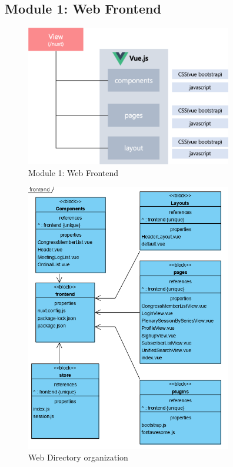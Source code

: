 \documentclass[conference]{IEEEtran}
\begin{document}
\vspace{70mm}
\subsection{Module 1: Web Frontend}
\begin{figure}[htbp]
	\centerline{\includegraphics[width=90mm,scale=0.5]{fig/6_4.png}}
	\caption{Module 1: Web Frontend}
	\label{fig}
	\end{figure}

\begin{figure}[htbp]
	\centerline{\includegraphics[width=90mm,scale=0.5]{fig/6_5.png}}
	\caption{Web Directory organization}
	\label{fig}
	\end{figure}
	
\end{document}
